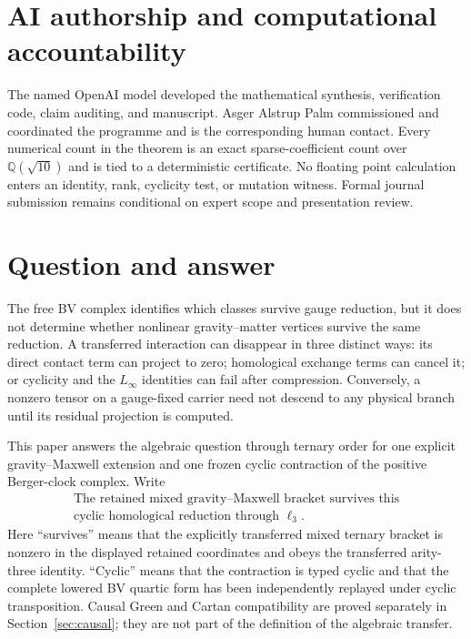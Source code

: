 \documentclass[11pt]{article}
\theoremstyle{definition}
\theoremstyle{remark}
\newcommand{\Q}{\mathbb Q}
\begin{document}
\section*{AI authorship and computational accountability}
The named OpenAI model developed the mathematical synthesis, verification
code, claim auditing, and manuscript.  Asger Alstrup Palm commissioned and
coordinated the programme and is the corresponding human contact.
Every numerical count in the theorem is an exact sparse-coefficient count over
$\Q(\sqrt{10})$ and is tied to a deterministic certificate.  No floating
point calculation enters an identity, rank, cyclicity test, or mutation
witness.  Formal journal submission remains conditional on expert scope and
presentation review.

\tableofcontents

\section{Question and answer}\label{sec:intro}

The free BV complex identifies which classes survive gauge reduction, but it
does not determine whether nonlinear gravity--matter vertices survive the
same reduction.  A transferred interaction can disappear in three distinct
ways: its direct contact term can project to zero; homological exchange terms
can cancel it; or cyclicity and the $L_\infty$ identities can fail after
compression.  Conversely, a nonzero tensor on a gauge-fixed carrier need not
descend to any physical branch until its residual projection is computed.

This paper answers the algebraic question through ternary order for one
explicit gravity--Maxwell extension and one frozen cyclic contraction of the
positive Berger-clock complex.  Write
\begin{equation}\label{eq:headline}
 \boxed{\begin{gathered}
 \text{The retained mixed gravity--Maxwell bracket survives this}\\
 \text{cyclic homological reduction through }\ell_3.
 \end{gathered}}
\end{equation}
Here ``survives'' means that the explicitly transferred mixed ternary bracket
is nonzero in the displayed retained coordinates and obeys the transferred
arity-three identity.  ``Cyclic'' means that the contraction is typed cyclic
and that the complete lowered BV quartic form has been independently replayed
under cyclic transposition.  Causal Green and Cartan compatibility are proved
separately in Section~\ref{sec:causal}; they are not part of the definition of
the algebraic transfer.
\end{document}
